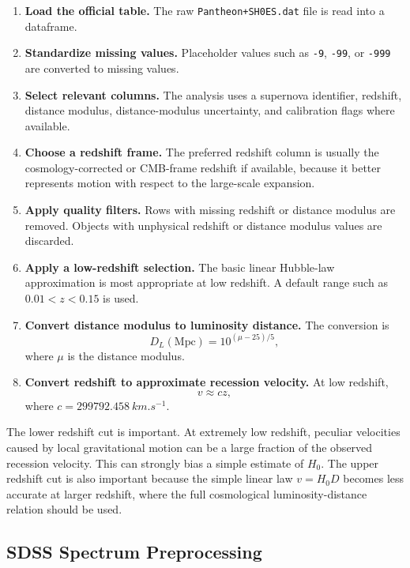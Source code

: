 \documentclass[11pt,a4paper]{article}
\begin{document}
\begin{enumerate}
    \item \textbf{Load the official table.} The raw \texttt{Pantheon+SH0ES.dat} file is read into a dataframe.
    \item \textbf{Standardize missing values.} Placeholder values such as \texttt{-9}, \texttt{-99}, or \texttt{-999} are converted to missing values.
    \item \textbf{Select relevant columns.} The analysis uses a supernova identifier, redshift, distance modulus, distance-modulus uncertainty, and calibration flags where available.
    \item \textbf{Choose a redshift frame.} The preferred redshift column is usually the cosmology-corrected or CMB-frame redshift if available, because it better represents motion with respect to the large-scale expansion.
    \item \textbf{Apply quality filters.} Rows with missing redshift or distance modulus are removed. Objects with unphysical redshift or distance modulus values are discarded.
    \item \textbf{Apply a low-redshift selection.} The basic linear Hubble-law approximation is most appropriate at low redshift. A default range such as $0.01 < z < 0.15$ is used.
    \item \textbf{Convert distance modulus to luminosity distance.} The conversion is
    \begin{equation}
        D_L(\mathrm{Mpc}) = 10^{(\mu - 25)/5},
    \end{equation}
    where $\mu$ is the distance modulus.
    \item \textbf{Convert redshift to approximate recession velocity.} At low redshift,
    \begin{equation}
        v \approx cz,
    \end{equation}
    where $c = \SI{299792.458}{km.s^{-1}}$.
\end{enumerate}

The lower redshift cut is important. At extremely low redshift, peculiar velocities caused by local gravitational motion can be a large fraction of the observed recession velocity. This can strongly bias a simple estimate of $H_0$. The upper redshift cut is also important because the simple linear law $v = H_0 D$ becomes less accurate at larger redshift, where the full cosmological luminosity-distance relation should be used.

\subsection{SDSS Spectrum Preprocessing}
\end{document}
